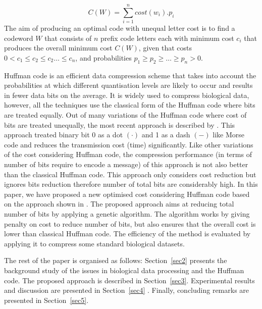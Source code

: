 \documentclass{singlecol-new}
\theoremstyle{TH}{
\newtheorem{lemma}{Lemma}
\newtheorem{theorem}[lemma]{Theorem}
\newtheorem{corrolary}[lemma]{Corrolary}
\newtheorem{conjecture}[lemma]{Conjecture}
\newtheorem{proposition}[lemma]{Proposition}
\newtheorem{claim}[lemma]{Claim}
\newtheorem{stheorem}[lemma]{Wrong Theorem}
}
\theoremstyle{THrm}{
\newtheorem{definition}{Definition}
\newtheorem{question}{Question}
\newtheorem{remark}{Remark}
\newtheorem{scheme}{Scheme}
}
\theoremstyle{THhit}{
\newtheorem{case}{Case}[section]
}
\begin{document}
\begin{equation}
C\left(W\right)=\sum_{i=1}^{n}cost\left(w_i\right).p_i 
\end{equation}
The aim of producing an optimal code with unequal letter cost is to find a codeword $W$ that consists of $n$ prefix code letters each with minimum cost $c_i$ that produces the overall minimum cost $C\left(W\right)$, given that costs $0<c_1\leq c_2 \leq c_2 \ldots \leq c_n$, and probabilities $p_1\geq p_2\geq \ldots\geq p_n>0$.

Huffman code \citep{Huff51} is an efficient data compression scheme that takes into account the probabilities at which different quantisation levels are likely to occur and results in fewer data bits on the average. It is widely used to compress biological data, however, all the techniques use the classical form of the Huffman code where bits are treated equally. Out of many variations of the Huffman code where cost of bits are treated unequally, the most recent approach is described by \citet{Kab14}. This approach treated binary bit 0 as a dot $\left(\cdot\right)$ and 1 as a dash $\left(-\right)$ like Morse code and reduces the transmission cost (time) significantly. Like other variations of the cost considering Huffman code, the compression performance (in terms of number of bits require to encode a message) of this approach is not also better than the classical Huffman code. This approach only considers cost reduction but ignores bits reduction therefore number of total bits are considerably high. In this paper, we have proposed a new optimised cost considering Huffman code based on the approach shown in \citep{Kab14}. %
The proposed approach aims at reducing total number of bits   by applying a genetic algorithm. The algorithm works by giving penalty on cost to reduce number of bits, but also ensures that the overall cost is lower than classical Huffman code.  The efficiency of the method is evaluated by applying it to compress some standard biological datasets.         

The rest of the paper is organised as follows: Section~\ref{sec2} presents the background study of the issues in biological data processing and the Huffman code. The proposed approach is described in Section~\ref{sec3}. Experimental results and discussion are presented in Section~\ref{sec4} . Finally, concluding remarks are presented in Section~\ref{sec5}.
\end{document}
